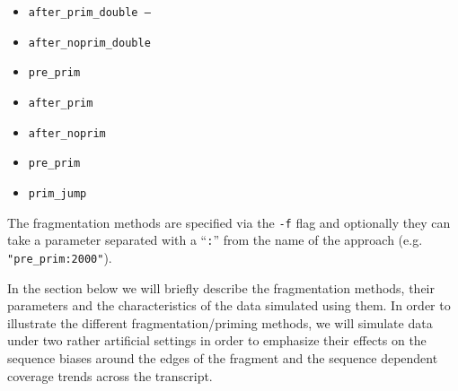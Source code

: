 \begin{itemize}
\item {\tt after\_prim\_double -- }
\item {\tt after\_noprim\_double}
\item {\tt pre\_prim}
\item {\tt after\_prim} 
\item {\tt after\_noprim}
\item {\tt pre\_prim}
\item {\tt prim\_jump}
\end{itemize}

The fragmentation methods are specified via the \texttt{-f} flag and optionally they can take a parameter separated with a ``\texttt{:}'' from the name of the approach (e.g. \texttt{"pre\_prim:2000"}).

In the section below we will briefly describe the fragmentation methods, their parameters and the characteristics of the data simulated using them. In order to illustrate the different fragmentation/priming methods, we will simulate data under two rather artificial settings in order to emphasize their effects on the sequence biases around the edges of the fragment and the sequence dependent coverage trends across the transcript.

